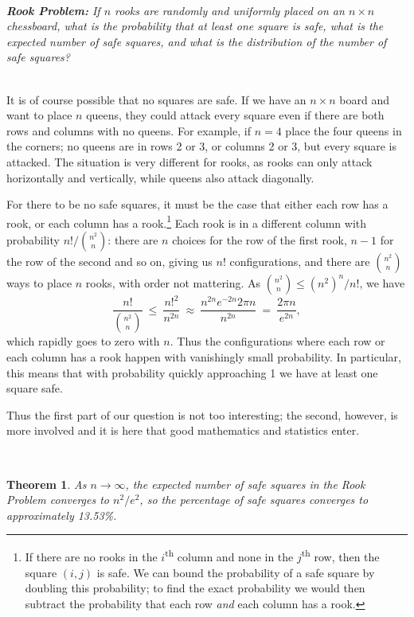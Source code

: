 \documentclass[12pt,reqno]{amsart}
\numberwithin{equation}{section}
\newtheorem{thm}{Theorem}[section]
\theoremstyle{plain}
\newcommand\be{\begin{equation}}
\newcommand\ee{\end{equation}}
\newcommand{\ncr}[2]{{#1 \choose #2}}
\begin{document}
\ \\

\noindent \emph{\textbf{Rook Problem:} If $n$ rooks are randomly and uniformly placed on an $n\times n$ chessboard, what is the probability that at least one square is safe, what is the expected number of safe squares, and what is the distribution of the number of safe squares?}

\ \\

It is of course possible that no squares are safe. If we have an $n\times n$ board and want to place $n$ queens, they could attack every square even if there are both rows and columns with no queens. For example, if $n=4$ place the four queens in the corners; no queens are in rows 2 or 3, or columns 2 or 3, but every square is attacked. The situation is very different for rooks, as rooks can only attack horizontally and vertically, while queens also attack diagonally.

For there to be no safe squares, it must be the case that either each row has a rook, or each column has a rook.\footnote{If there are no rooks in the $i$\textsuperscript{th} column and none in the $j$\textsuperscript{th} row, then the square $(i,j)$ is safe. We can bound the probability of a safe square by doubling this probability; to find the exact probability we would then subtract the probability that each row \emph{and} each column has a rook.} Each rook is in a different column with probability $n! / \ncr{n^2}{n}$: there are $n$ choices for the row of the first rook, $n-1$ for the row of the second and so on, giving us $n!$ configurations, and there are $\ncr{n^2}{n}$ ways to place $n$ rooks, with order not mattering. As $\ncr{n^2}{n} \le (n^2)^n/n!$, we have \be \frac{n!}{\ncr{n^2}{n}} \ \le \ \frac{n!^2}{n^{2n}} \ \approx \ \frac{n^{2n} e^{-2n} 2 \pi n}{n^{2n}} \ = \ \frac{2\pi n}{e^{2n}}, \ee which rapidly goes to zero with $n$. Thus the configurations where each row or each column has a rook happen with vanishingly small probability. In particular, this means that with probability quickly approaching 1 we have at least one square safe.

Thus the first part of our question is not too interesting; the second, however, is more involved and it is here that good mathematics and statistics enter.

\ \\

\begin{thm} As $n \to \infty$, the expected number of safe squares in the Rook Problem converges to $n^2/e^2$, so the percentage of safe squares converges to approximately 13.53\%.
\end{thm}
\end{document}
